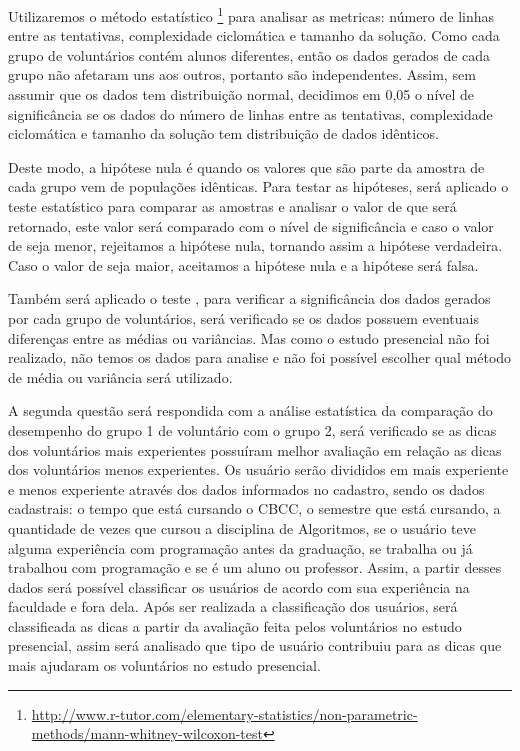 Utilizaremos o método estatístico \footnote{\url{http://www.r-tutor.com/elementary-statistics/non-parametric-methods/mann-whitney-wilcoxon-test}} para analisar as metricas: número de linhas entre as tentativas, complexidade ciclomática e tamanho da solução. Como cada grupo de voluntários contém alunos diferentes, então os dados gerados de cada grupo não afetaram uns aos outros, portanto são independentes. Assim, sem assumir que os dados tem distribuição normal, decidimos em 0,05 o nível de significância se os dados do número de linhas entre as tentativas, complexidade ciclomática e tamanho da solução tem distribuição de dados idênticos. 

Deste modo, a hipótese nula é quando os valores que são parte da amostra de cada grupo vem de populações idênticas. Para testar as hipóteses, será aplicado o teste estatístico para comparar as amostras e analisar o valor de  que será retornado, este valor será comparado com o nível de significância e caso o valor de  seja menor, rejeitamos a hipótese nula, tornando assim a hipótese verdadeira. Caso o valor de  seja maior, aceitamos a hipótese nula e a hipótese será falsa. 

Também será aplicado o teste  \cite{macbeth2011cliff}, para verificar a significância dos dados gerados por cada grupo de voluntários, será verificado se os dados possuem eventuais diferenças entre as médias ou variâncias. Mas como o estudo presencial não foi realizado, não temos os dados para analise e não foi possível escolher qual método de média ou variância será utilizado.

A segunda questão será respondida com a análise estatística da comparação do desempenho do grupo 1 de voluntário com o grupo 2, será verificado se as dicas dos voluntários mais experientes possuíram melhor avaliação em relação as dicas dos voluntários menos experientes. Os usuário serão divididos em mais experiente e menos experiente através dos dados informados no cadastro, sendo os dados cadastrais: o tempo que está cursando o CBCC, o semestre que está cursando, a quantidade de vezes que cursou a disciplina de Algoritmos, se o usuário teve alguma experiência com programação antes da graduação, se trabalha ou já trabalhou com programação e se é um aluno ou professor. Assim, a partir desses dados será possível classificar os usuários de acordo com sua experiência na faculdade e fora dela. Após ser realizada a classificação dos usuários, será classificada as dicas a partir da avaliação feita pelos voluntários no estudo presencial, assim será analisado que tipo de usuário contribuiu para as dicas que mais ajudaram os voluntários no estudo presencial.

